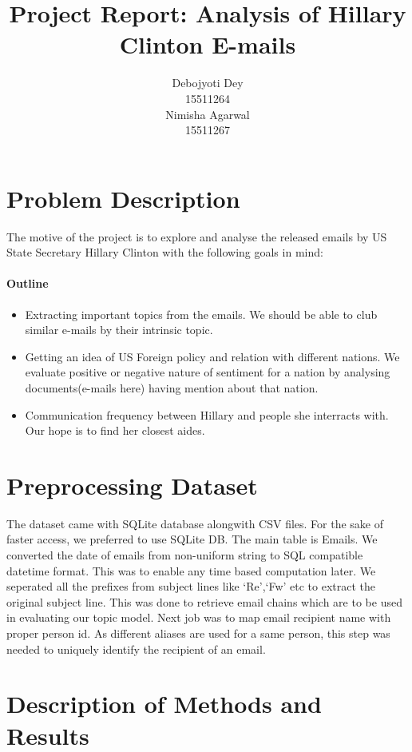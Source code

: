 \documentclass{article} %
\title{Project Report: Analysis of Hillary Clinton E-mails}
\author{
Debojyoti Dey \\
15511264 \\
\And
Nimisha Agarwal \\
15511267 \\
}
\begin{document}
\maketitle

\section{Problem Description}

The motive of the project is to explore and analyse the released emails by US State Secretary Hillary Clinton with the following goals in mind:

\paragraph{Outline}
\begin{itemize}
\item Extracting important topics from the emails. We should be able to club similar e-mails by their intrinsic topic.
\item Getting an idea of US Foreign policy and relation with different nations. We evaluate positive or negative nature of sentiment for a nation by analysing documents(e-mails here) having mention about that nation.
\item Communication frequency between Hillary and people she interracts with. Our hope is to find her closest aides.
\end{itemize}


\section{Preprocessing Dataset}

The dataset came with SQLite database alongwith CSV files. For the sake of faster access, we preferred to use SQLite DB. The main table is Emails. We converted the date of emails from non-uniform string to SQL compatible datetime format. This was to enable any time based computation later. We seperated all the prefixes from subject lines like `Re',`Fw' etc to extract the original subject line. This was done to retrieve email chains which are to be used in evaluating our topic model. Next job was to map email recipient name with proper person id. As different aliases are used for a same person, this step was needed to uniquely identify the recipient of an email.

\section{Description of Methods and Results}
\end{document}
